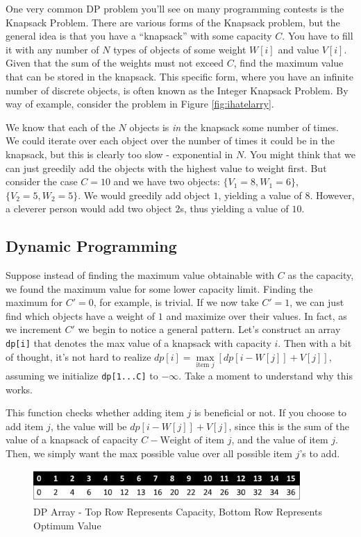 One very common DP problem you'll see on many programming contests is the Knapsack Problem.  There are various forms of the Knapsack problem, but the general idea is that you have a ``knapsack'' with some capacity $C$.  You have to fill it with any number of $N$ types of objects of some weight $W[i]$ and value $V[i]$.  Given that the sum of the weights must not exceed $C$, find the maximum value that can be stored in the knapsack.  This specific form, where you have an infinite number of discrete objects, is often known as the Integer Knapsack Problem.
%
By way of example, consider the problem in Figure \ref{fig:ihatelarry}.
%


We know that each of the $N$ objects is \textit{in} the knapsack some number of times.  We could iterate over each object over the number of times it could be in the knapsack, but this is clearly too slow - exponential in $N$.
%
You might think that we can just greedily add the objects with the highest value to weight first.  But consider the case $C = 10$ and we have two objects: $\{V_1 = 8, W_1 = 6\}$, $\{V_2 = 5, W_2 = 5\}$.  We would greedily add object $1$, yielding a value of $8$.  However, a cleverer person would add two object $2$s, thus yielding a value of $10$.
%
\subsection{Dynamic Programming}
Suppose instead of finding the maximum value obtainable with $C$ as the capacity, we found the maximum value for some lower capacity limit.  Finding the maximum for $C'=0$, for example, is trivial.  If we now take $C'=1$, we can just find which objects have a weight of $1$ and maximize over their values.  In fact, as we increment $C'$ we begin to notice a general pattern.  Let's construct an array \verb=dp[i]= that denotes the max value of a knapsack with capacity $i$.  Then with a bit of thought, it's not hard to realize $dp[i] = \max\limits_{\text{item } j} \left[dp[i-W[j]]+V[j]\right]$, assuming we initialize \verb=dp[1...C]= to $-\infty$.  Take a moment to understand why this works.

This function checks whether adding item $j$ is beneficial or not.  If you choose to add item $j$, the value will be $dp[i - W[j]] + V[j]$, since this is the sum of the value of a knapsack of capacity $C - \text{Weight of item }j$, and the value of item $j$.  Then, we simply want the max possible value over all possible item $j$'s to add.
%
\begin{figure}[h]
\begin{center}
\includegraphics[width=4in]{images/knapsack2.png}
\end{center}
\caption{DP Array - Top Row Represents Capacity, Bottom Row Represents Optimum Value}
\end{figure}


